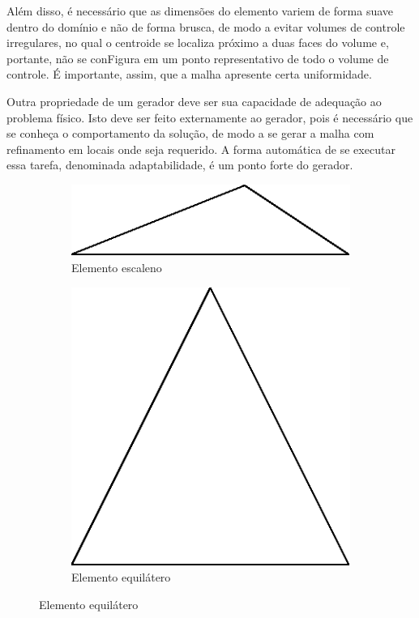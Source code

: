 Além disso, é necessário que as dimensões do elemento variem de forma suave dentro do domínio e não de forma brusca, de modo a evitar volumes de controle irregulares, no qual o centroide se localiza próximo a duas faces do volume e, portante, não se conFigura em um ponto representativo de todo o volume de controle. É importante, assim, que a malha apresente certa uniformidade.

Outra propriedade de um gerador deve ser sua capacidade de adequação ao problema físico. Isto deve ser feito externamente ao gerador, pois é necessário que se conheça o comportamento da solução, de modo a se gerar a malha com refinamento em locais onde seja requerido. A forma automática de se executar essa tarefa, denominada adaptabilidade, é um ponto forte do gerador.

\begin{figure}[ht]
    \begin{subfigure}{.5\textwidth}
        \centering
        \includegraphics[width=.8\linewidth]{fig/escaleno.eps}
        \caption{Elemento escaleno}
        \label{fig:sub-escaleno}
    \end{subfigure}
    \begin{subfigure}{.5\textwidth}
        \centering
        \includegraphics[width=.4\linewidth]{fig/equilatero.eps}
        \caption{Elemento equilátero}
        \label{fig:sub-second}
    \end{subfigure}


\end{figure}
